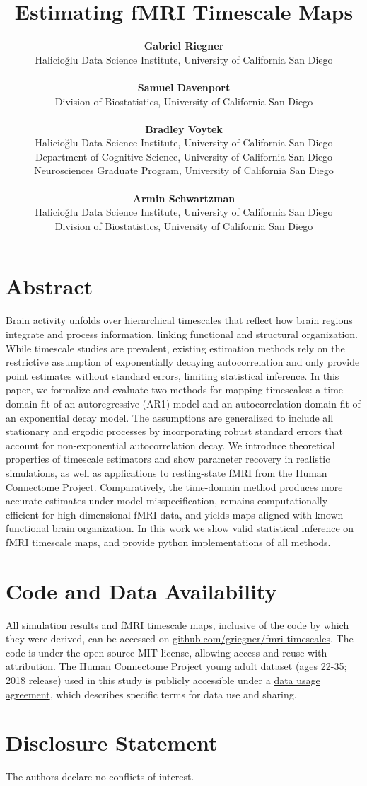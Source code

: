 \documentclass[9pt]{article}
\title{Estimating fMRI Timescale Maps}
\author{
\normalfont
\textbf{Gabriel Riegner}\\
Halicio\u{g}lu Data Science Institute, University of California San Diego\\\\
\textbf{Samuel Davenport}\\
Division of Biostatistics, University of California San Diego\\\\
\textbf{Bradley Voytek}\\
Halicio\u{g}lu Data Science Institute, University of California San Diego\\
Department of Cognitive Science, University of California San Diego\\
Neurosciences Graduate Program, University of California San Diego\\\\
\textbf{Armin Schwartzman}\\
Halicio\u{g}lu Data Science Institute, University of California San Diego\\
Division of Biostatistics, University of California San Diego\\
}
\date{}
\begin{document}
\maketitle

\section*{Abstract}
Brain activity unfolds over hierarchical timescales that reflect how brain regions integrate and process information, linking functional and structural organization. While timescale studies are prevalent, existing estimation methods rely on the restrictive assumption of exponentially decaying autocorrelation and only provide point estimates without standard errors, limiting statistical inference. In this paper, we formalize and evaluate two methods for mapping timescales: a time-domain fit of an autoregressive (AR1) model and an autocorrelation-domain fit of an exponential decay model. The assumptions are generalized to include all stationary and ergodic processes by incorporating robust standard errors that account for non-exponential autocorrelation decay. We introduce theoretical properties of timescale estimators and show parameter recovery in realistic simulations, as well as applications to resting-state fMRI from the Human Connectome Project. Comparatively, the time-domain method produces more accurate estimates under model misspecification, remains computationally efficient for high-dimensional fMRI data, and yields maps aligned with known functional brain organization. In this work we show valid statistical inference on fMRI timescale maps, and provide python implementations of all methods.

\thispagestyle{empty}
\newpage
\setcounter{page}{1}







\section*{Code and Data Availability}
All simulation results and fMRI timescale maps, inclusive of the code by which they were derived, can be accessed on \href{https://github.com/griegner/fmri-timescales}{github.com/griegner/fmri-timescales}. The code is under the open source MIT license, allowing access and reuse with attribution. The Human Connectome Project young adult dataset (ages 22-35; 2018 release) used in this study is publicly accessible under a \href{https://www.humanconnectome.org/storage/app/media/data_use_terms/DataUseTerms-HCP-Open-Access-26Apr2013.pdf}{data usage agreement}, which describes specific terms for data use and sharing.

\section*{Disclosure Statement}
The authors declare no conflicts of interest.

\bigskip

\end{document}
